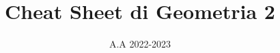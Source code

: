 \documentclass[10pt]{report}
\title{\Huge{Cheat Sheet di Geometria 2}}
\date{A.A 2022-2023}
\author{}
\begin{document}
\maketitle

\begin{multicols*}{2}
    \tableofcontents
\end{multicols*}

\newpage




\end{document}
